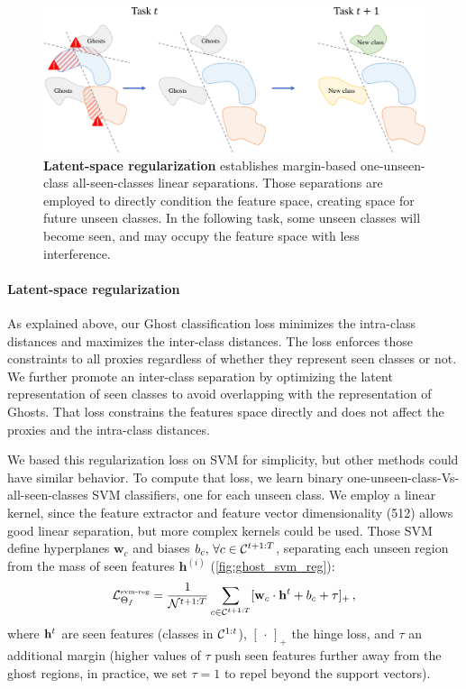 \begin{figure}
    \centering
    \includegraphics[width=0.7\linewidth]{images/ghost/svm_reg.pdf}
    \caption{\textbf{Latent-space regularization} establishes margin-based one-unseen-class \vs
        all-seen-classes linear separations. Those separations are employed to directly condition
        the feature space, creating space for future unseen classes. In the following task, some
        unseen classes will become seen, and may occupy the feature space with less interference.}
    \label{fig:ghost_svm_reg}
\end{figure}

\label{sec:ghost_svm}
\paragraph{Latent-space regularization}
As explained above, our Ghost classification loss minimizes the intra-class distances and maximizes
the inter-class distances. The loss enforces those constraints to all proxies regardless of whether
they represent seen classes or not. We further promote an inter-class separation by optimizing the
latent representation of seen classes to avoid overlapping with the representation of Ghosts. That
loss constrains the features space directly and does not affect the proxies and the intra-class
distances.

We based this regularization loss on SVM \citep{cortes1995svm} for simplicity, but other methods
could have similar behavior. To compute that loss, we learn binary
one-unseen-class-Vs-all-seen-classes SVM classifiers, one for each unseen class. We employ a linear
kernel, since the feature extractor and feature vector dimensionality (512) allows good linear
separation, but more complex kernels could be used. Those \acs{SVM} define hyperplanes
$\mathbf{w}_c$ and biases $b_c,\, \forall c \in \mathcal{C}^{t+1:T}$, separating each unseen region from
the mass of seen features $\mathbf{h}^{(i)}$ (\autoref{fig:ghost_svm_reg}):
%
\begin{equation}
    \mathcal{L}^\text{\tiny{svm-reg}}_{\Theta_f} = \frac{1}{\mathcal{N}^{t+1:T}} \sum_{c\in \mathcal{C}^{t+1:T}} [\mathbf{w}_c \cdot \mathbf{h}^t + b_c + \tau]_+\,,
    \label{eq:ghost_svm}
\end{equation}
%
\noindent where $\mathbf{h}^t$ are seen features (classes in $\mathcal{C}^{1:t}$), $[\,\cdot\,]_+$ the hinge loss,
and $\tau$ an additional margin (higher values of $\tau$ push seen features further away from the
ghost regions, in practice, we set $\tau=1$ to repel beyond the support vectors).

